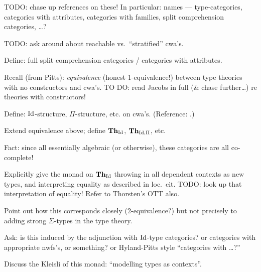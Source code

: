 TODO: chase up references on these!  In particular: names --- type-categories, categories with attributes, categories with families, split comprehension categories, \ldots ?

TODO: ask around about reachable vs.\ ``stratified'' cwa's.


Define: full split comprehension categories \cite[4.10]{jacobs:comprehension-categories} / categories with attributes.  \cite[\S 6.4]{pitts:categorical-logic}

Recall (from Pitts): \emph{equivalence} (honest 1-equivalence!) between type theories with no constructors and cwa's.  TO DO: read Jacobs in full (\& chase further\ldots) re theories with constructors!

Define: $\mathrm{Id}$-structure, $\Pi$-structure, etc. on cwa's.  (Reference: \cite{awodey-warren}.)

Extend equivalence above; define $\mathbf{Th}_{\mathrm{Id}}$, $\mathbf{Th}_{\mathrm{Id},\Pi}$, etc.  

Fact: since all essentially algebraic (or otherwise), these categories are all co-complete!

  Explicitly give the monad on $\mathbf{Th}_{\mathrm{Id}}$ throwing in all dependent contexts as new types, and interpreting equality as described in loc.~cit.  TODO: look up that interpretation of equality!  Refer to Thorsten's OTT also.

Point out how this corresponds closely (2-equivalence?) but not precisely to adding strong $\Sigma$-types in the type theory.

Ask: is this induced by the adjunction with $\mathrm{Id}$-type categories?  or categories with appropriate nwfs's, or something?  or Hyland-Pitts style ``categories with \ldots?''

Discuss the Kleisli of this monad: ``modelling types as contexts''.


% 




